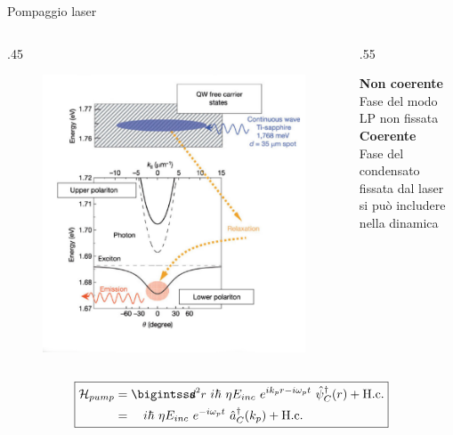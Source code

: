 \begin{frame}{Pompaggio laser}
  \begin{columns}
 \begin{column}
  {.45\textwidth}
    \begin{figure}[t]
    \flushleft
     \includegraphics[scale=.18]{pics/incoherent.png}
    \end{figure}

 \end{column}
  \begin{column}
  {.55\textwidth}

     \textbf{Non coerente}\\
     Fase del modo LP non fissata\\
     \vskip15pt
     \textbf{Coerente}\\
     Fase del condensato fissata dal laser\\
     si può includere nella dinamica
   \end{column}
\end{columns}

 \begin{equation*}
 \boxed{
    \begin{align*}
       \ham_{pump} &=\intr i\hbar \ \eta E_{inc} \ e^{ik_p r -i\omega_p t} \ \opsi_C^\dagger (r) +\hc \\
        &= \quad i\hbar \ \eta E_{inc} \ e^{-i\omega_p t} \ \oa_C^\dagger (k_p) +\hc
    \end{align*}
    }
 \end{equation*}
\end{frame}

